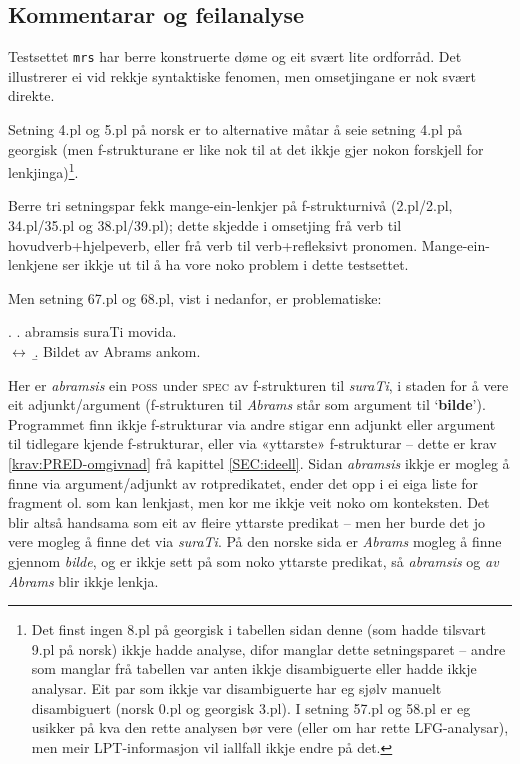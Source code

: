 \documentclass[11pt,a4paper,oneside,draft]{report}
\newcommand{\F}[2]{\textsc{#1}\ensuremath{_{#2}}}
\newcommand{\SPEC}{\F{spec}{}}
\newcommand{\POSS}{\F{poss}{}}
\newcommand{\p}[1]{`\textbf{#1}'}
\begin{document}
\subsection{Kommentarar og feilanalyse}
\label{sec-5.3.1}

\label{SEC:feilanalyse}

Testsettet \texttt{mrs} har berre konstruerte døme og eit svært lite
ordforråd. Det illustrerer ei vid rekkje syntaktiske fenomen, men
omsetjingane er nok svært direkte. 

Setning 4.pl og 5.pl på norsk er to alternative måtar å seie setning 4.pl
på georgisk (men f-strukturane er like nok til at det ikkje gjer nokon
forskjell for lenkjinga)\footnote{Det finst ingen 8.pl på georgisk i tabellen sidan denne (som
        hadde tilsvart 9.pl på norsk) ikkje hadde analyse, difor
        manglar dette setningsparet -- andre som manglar frå tabellen
        var anten ikkje disambiguerte eller hadde ikkje analysar. Eit
        par som ikkje var disambiguerte har eg sjølv manuelt
        disambiguert (norsk 0.pl og georgisk 3.pl). I setning 57.pl og
        58.pl er eg usikker på kva den rette analysen bør vere (eller
        om har rette LFG-analysar), men meir LPT-informasjon vil
        iallfall ikkje endre på det. }.

Berre tri setningspar fekk mange-ein-lenkjer på f-strukturnivå
(2.pl/2.pl, 34.pl/35.pl og 38.pl/39.pl); dette skjedde i omsetjing frå
verb til hovudverb+hjelpeverb, eller frå verb til verb+refleksivt
pronomen. Mange-ein-lenkjene ser ikkje ut til å ha vore noko problem i
dette testsettet.

Men setning 67.pl og 68.pl, vist i \Next nedanfor, er problematiske:

\ex. \a. abramsis suraTi movida.\\
     $\leftrightarrow$
     \b. Bildet av Abrams ankom.

 Her er \emph{abramsis} ein \POSS{} under \SPEC{} av f-strukturen til
 \emph{suraTi}, i staden for å vere eit adjunkt/argument (f-strukturen til
 \emph{Abrams} står som argument til \p{bilde}). Programmet finn ikkje
 f-strukturar via andre stigar enn adjunkt eller argument til
 tidlegare kjende f-strukturar, eller via «yttarste» f-strukturar --
 dette er krav \ref{krav:PRED-omgivnad} frå kapittel
 \ref{SEC:ideell}. Sidan \emph{abramsis} ikkje er mogleg å finne via
 argument/adjunkt av rotpredikatet, ender det opp i ei eiga liste for
 fragment ol. som kan lenkjast, men kor me ikkje veit noko om
 konteksten. Det blir altså handsama som eit av fleire yttarste predikat
 -- men her burde det jo vere mogleg å finne det via \emph{suraTi}. På den
 norske sida er \emph{Abrams} mogleg å finne gjennom \emph{bilde}, og er ikkje
 sett på som noko yttarste predikat, så \emph{abramsis} og \emph{av Abrams} blir
 ikkje lenkja.
\end{document}
